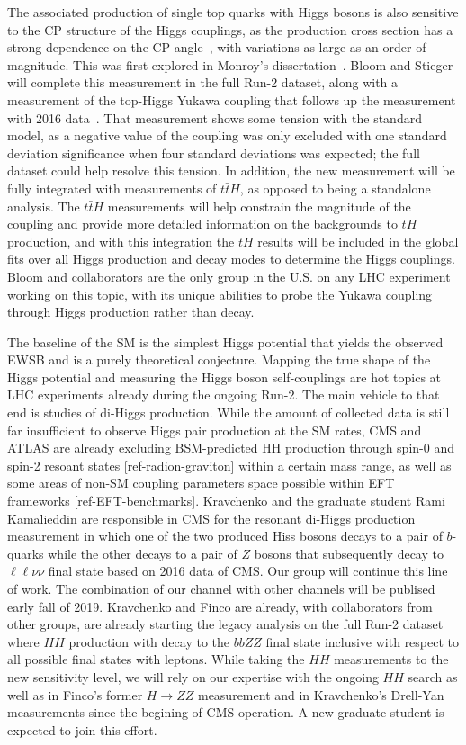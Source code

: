 The associated production of single top quarks with Higgs bosons is also sensitive to the CP structure of the Higgs couplings, as the production cross section has a strong dependence on the CP angle~\cite{bib:tH_theory}, with variations as large as an order of magnitude.  This was first explored in Monroy's dissertation~\cite{bib:monroy_thesis}. Bloom and Stieger will complete this measurement in the full Run-2 dataset, along with a measurement of the top-Higgs Yukawa coupling that follows up the measurement with 2016 data~\cite{bib:tHqRun2}.  That measurement shows some tension with the standard model, as a negative value of the coupling was only excluded with one standard deviation significance when four standard deviations was expected; the full dataset could help resolve this tension.  In addition, the new measurement will be fully integrated with measurements of $t\bar{t}H$, as opposed to being a standalone analysis.  The $t\bar{t}H$ measurements will help constrain the magnitude of the coupling and provide more detailed information on the backgrounds to $tH$ production, and with this integration the $tH$ results will be included in the global fits over all Higgs production and decay modes to determine the Higgs couplings.  Bloom and collaborators are the only group in the U.S. on any LHC experiment working on this topic, with its unique abilities to probe the Yukawa coupling through Higgs production rather than decay.

The baseline of the SM is the simplest Higgs potential that yields the observed EWSB and is a purely theoretical conjecture. Mapping the true shape of the  Higgs potential and measuring the Higgs boson self-couplings are hot topics at LHC experiments already during the ongoing Run-2. The main vehicle to that end is studies of di-Higgs production. While the amount of collected data is still far insufficient to observe Higgs pair production at the SM rates, CMS and ATLAS are already excluding BSM-predicted HH production through spin-0 and spin-2 resoant states [ref-radion-graviton] within a certain mass range, as well as some areas of non-SM coupling parameters space possible within EFT frameworks [ref-EFT-benchmarks]. Kravchenko and the graduate student Rami Kamalieddin are responsible in CMS for the resonant di-Higgs production measurement in which one of the two produced Hiss bosons decays to a pair of $b$-quarks while the other decays to a pair of $Z$ bosons that subsequently
decay to $\ell\ell\nu\nu$ final state based on 2016 data of CMS. Our group will continue this line of work. The combination of our channel with other channels will be publised early fall of 2019. Kravchenko and Finco are already, with collaborators from other groups, are already starting the legacy analysis on the full Run-2 dataset where $HH$ production with decay to the $bbZZ$ final state inclusive with respect to all possible final states with leptons. While taking the $HH$ measurements to the new sensitivity level, we will rely on our expertise with the ongoing $HH$ search as well as in Finco's former $H\to ZZ$ measurement and in Kravchenko's Drell-Yan measurements since the begining of CMS operation. A new graduate student is expected to join this effort.

